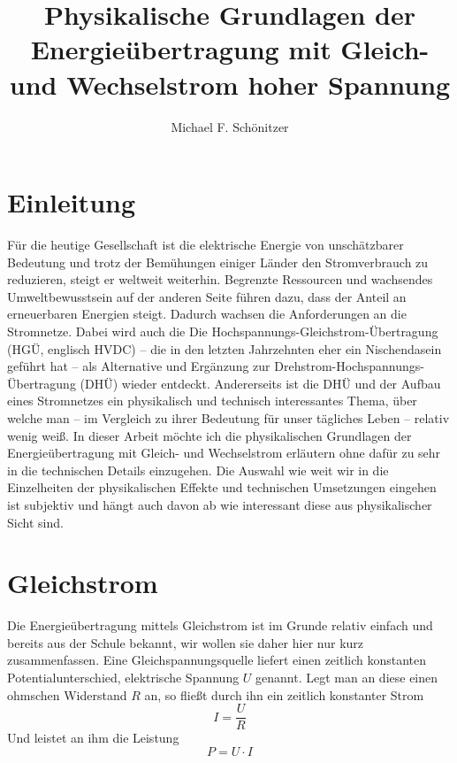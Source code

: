 \documentclass[10pt,a4paper]{article}
\author{Michael F. Schönitzer}
\title{Physikalische Grundlagen der Energieübertragung mit Gleich- und Wechselstrom hoher Spannung }
\begin{document}
\maketitle

\section{Einleitung}
Für die heutige Gesellschaft ist die elektrische Energie von unschätzbarer Bedeutung und trotz der Bemühungen einiger Länder den Stromverbrauch zu reduzieren, steigt er weltweit weiterhin. Begrenzte Ressourcen und wachsendes Umweltbewusstsein auf der anderen Seite führen dazu, dass der Anteil an erneuerbaren Energien steigt. Dadurch wachsen die Anforderungen an die Stromnetze. Dabei wird auch die Die Hochspannungs-Gleichstrom-Übertragung (HGÜ, englisch HVDC) -- die in den letzten Jahrzehnten eher ein Nischendasein geführt hat -- als Alternative und Ergänzung zur Drehstrom-Hochspannungs-Übertragung (DHÜ) wieder entdeckt.
Andererseits ist die DHÜ und der Aufbau eines Stromnetzes ein physikalisch und technisch interessantes Thema, über welche man -- im Vergleich zu ihrer Bedeutung für unser tägliches Leben -- relativ wenig weiß.
In dieser Arbeit möchte ich die physikalischen Grundlagen der Energieübertragung mit Gleich- und Wechselstrom erläutern ohne dafür zu sehr in die technischen Details einzugehen. Die Auswahl wie weit wir in die Einzelheiten der physikalischen Effekte und technischen Umsetzungen eingehen ist subjektiv und hängt auch davon ab wie interessant diese aus physikalischer Sicht sind.

\section{Gleichstrom}
Die Energieübertragung mittels Gleichstrom ist im Grunde relativ einfach und bereits aus der Schule bekannt, wir wollen sie daher hier nur kurz zusammenfassen.
Eine Gleichspannungsquelle liefert einen zeitlich konstanten Potentialunterschied, elektrische Spannung $U$ genannt. Legt man an diese einen ohmschen Widerstand $R$ an, so fließt durch ihn ein zeitlich konstanter Strom
\begin{equation}
I = \frac{U}{R}
\end{equation}
Und leistet an ihm die Leistung
\begin{equation}
P = U \cdot I
\end{equation}


\end{document}
